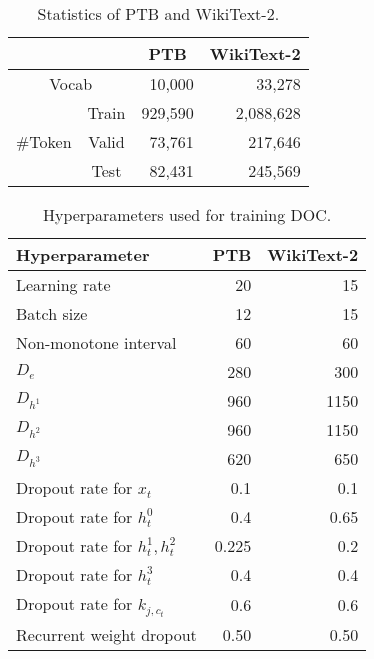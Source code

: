 \documentclass[11pt,a4paper]{article}
\begin{document}
\begin{table}[!t]
  \centering
  \small
  \begin{tabular}{| c c | r | r |} \hline
  \multicolumn{2}{|c|}{} & \multicolumn{1}{c|}{PTB} & \multicolumn{1}{c|}{WikiText-2} \\ \hline
  \multicolumn{2}{|c|}{Vocab} & 10,000 & 33,278 \\ \hline
   & Train & 929,590 & 2,088,628 \\
   \#Token & Valid & 73,761 & 217,646 \\
   & Test & 82,431 & 245,569 \\ \hline
  \end{tabular}
  \caption{Statistics of PTB and WikiText-2.\label{tab:dataset}}
\end{table}


\begin{table}[!t]
  \centering
  \small
  \begin{tabular}{| l | r | r |} \hline
  Hyperparameter & PTB & WikiText-2 \\ \hline
  Learning rate & 20 & 15 \\
  Batch size & 12 & 15 \\
  Non-monotone interval & 60 & 60 \\
  $D_e$ & 280 & 300 \\
  $D_{h^1}$ & 960 & 1150 \\
  $D_{h^2}$ & 960 & 1150 \\
  $D_{h^3}$ & 620 & 650 \\ \hline
  Dropout rate for $x_t$ & 0.1 & 0.1 \\
  Dropout rate for $h^0_t$ & 0.4 & 0.65 \\
  Dropout rate for $h^1_t, h^2_t$ & 0.225 & 0.2 \\
  Dropout rate for $h^3_t$ & 0.4 & 0.4 \\
  Dropout rate for $k_{j, c_t}$ & 0.6 & 0.6 \\
  Recurrent weight dropout & 0.50 & 0.50 \\ \hline
  \end{tabular}
  \caption{Hyperparameters used for training DOC.\label{tab:hyperparameters}}
\end{table}
\end{document}

